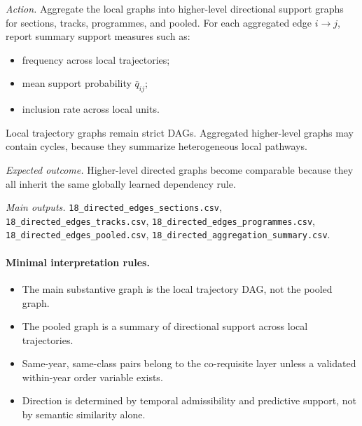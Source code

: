 \begin{enumerate}
    \textit{Action.} Aggregate the local graphs into higher-level directional support graphs for
    sections, tracks, programmes, and pooled. For each aggregated edge $i \rightarrow j$, report
    summary support measures such as:
    \begin{itemize}
        \item frequency across local trajectories;
        \item mean support probability $\bar q_{ij}$;
        \item inclusion rate across local units.
    \end{itemize}
    Local trajectory graphs remain strict DAGs. Aggregated higher-level graphs may contain cycles,
    because they summarize heterogeneous local pathways.

    \textit{Expected outcome.} Higher-level directed graphs become comparable because they all
    inherit the same globally learned dependency rule.

    \textit{Main outputs.}
    \texttt{18\_directed\_edges\_sections.csv},
    \texttt{18\_directed\_edges\_tracks.csv},
    \texttt{18\_directed\_edges\_programmes.csv},
    \texttt{18\_directed\_edges\_pooled.csv},
    \texttt{18\_directed\_aggregation\_summary.csv}.

\end{enumerate}

\paragraph{Minimal interpretation rules.}
\begin{itemize}
    \item The main substantive graph is the local trajectory DAG, not the pooled graph.
    \item The pooled graph is a summary of directional support across local trajectories.
    \item Same-year, same-class pairs belong to the co-requisite layer unless a validated
    within-year order variable exists.
    \item Direction is determined by temporal admissibility and predictive support, not by
    semantic similarity alone.
\end{itemize}